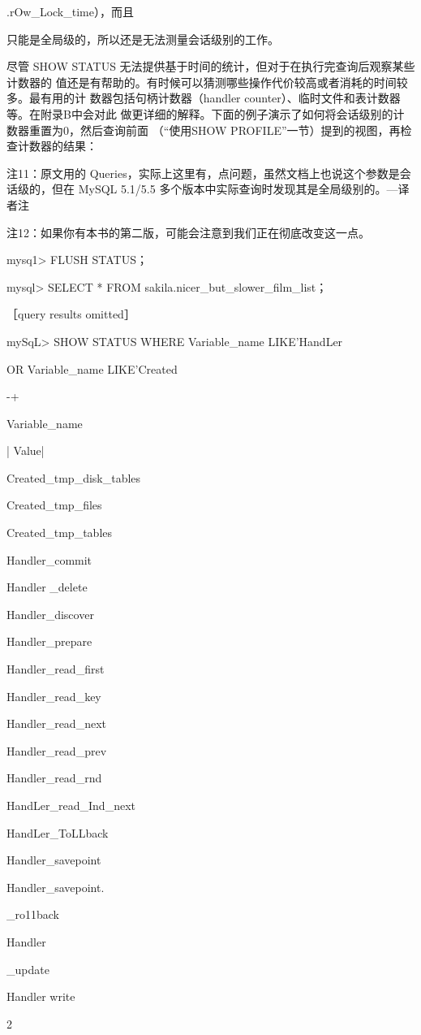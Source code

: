 {.rOw\_Lock\_time），而且

只能是全局级的，所以还是无法测量会话级别的工作。

尽管 SHOW STATUS 无法提供基于时间的统计，但对于在执行完查询后观察某些计数器的
值还是有帮助的。有时候可以猜测哪些操作代价较高或者消耗的时间较多。最有用的计
数器包括句柄计数器（handler counter）、临时文件和表计数器等。在附录B中会对此
做更详细的解释。下面的例子演示了如何将会话级别的计数器重置为0，然后查询前面
（“使用SHOW PROFILE”一节）提到的视图，再检查计数器的结果：

注11：原文用的 Queries，实际上这里有，点问题，虽然文档上也说这个参数是会话级的，但在 MySQL 5.1/5.5
多个版本中实际查询时发现其是全局级别的。—译者注

注12：如果你有本书的第二版，可能会注意到我们正在彻底改变这一点。

mysq1> FLUSH STATUS；

mysql> SELECT * FROM sakila.nicer\_but\_slower\_film\_list；

［query results omitted］

mySqL> SHOW STATUS WHERE Variable\_name LIKE'HandLer%

OR Variable\_name LIKE'Created%

-+

Variable\_name

| Value|

Created\_tmp\_disk\_tables

Created\_tmp\_files

Created\_tmp\_tables

Handler\_commit

Handler \_delete

Handler\_discover

Handler\_prepare

Handler\_read\_first

Handler\_read\_key

Handler\_read\_next

Handler\_read\_prev

Handler\_read\_rnd

HandLer\_read\_Ind\_next

HandLer\_ToLLback

Handler\_savepoint

Handler\_savepoint.

\_ro11back

Handler

\_update

Handler write

2

}
